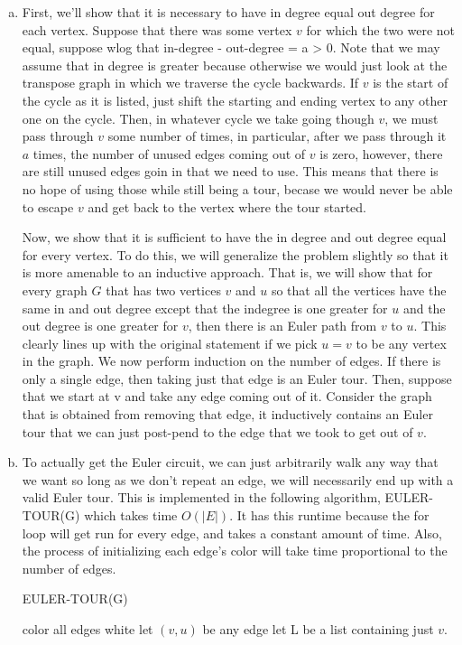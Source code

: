 \documentclass{article}
\begin{document}
\begin{enumerate}[a.]
\item
First, we'll show that it is necessary to have in degree equal out degree for each vertex. Suppose that there was some vertex $v$ for which the two were not equal, suppose wlog that in-degree - out-degree = a > 0. Note that we may assume that in degree is greater because otherwise we would just look at the transpose graph in which we traverse the cycle backwards. If $v$ is the start of the cycle as it is listed, just shift the starting and ending vertex to any other one on the cycle. Then, in whatever cycle we take going though $v$, we must pass through $v$ some number of times, in particular, after we pass through it $a$ times, the number of unused edges coming out of $v$ is zero, however, there are still unused edges goin in that we need to use. This means that there is no hope of using those while still being a tour, becase we would never be able to escape $v$ and get back to the vertex where the tour started.

Now, we show that it is sufficient to have the in degree and out degree equal for every vertex. To do this, we will generalize the problem slightly so that it is more amenable to an inductive approach. That is, we will show that for every graph $G$ that has two vertices $v$ and $u$ so that all the vertices have the same in and out degree except that the indegree is one greater for $u$ and the out degree is one greater for $v$, then there is an Euler path from $v$ to $u$. This clearly lines up with the original statement if we pick $u=v$ to be any vertex in the graph. We now perform induction on the number of edges. If there is only a single edge, then taking just that edge is an Euler tour. Then, suppose that we start at v and take any edge coming out of it. Consider the graph that is obtained from removing that edge, it inductively contains an Euler tour that we can just post-pend to the edge that we took to get out of $v$.\\

\item
To actually get the Euler circuit, we can just arbitrarily walk any way that we want so long as we don't repeat an edge, we will necessarily end up with a valid Euler tour. This is implemented in the following algorithm, EULER-TOUR(G) which takes time $O(|E|)$. It has this runtime because the for loop will get run for every edge, and takes a constant amount of time. Also, the process of initializing each edge's color will take time proportional to the number of edges.\\
\begin{algorithm}
\caption{EULER-TOUR(G)}
\begin{algorithmic}
\State color all edges white
\State let $(v,u)$ be any edge
\State let L be a list containing just $v$.
\EndWhile
\end{algorithmic}
\end{algorithm}
\end{enumerate}
\end{document}
